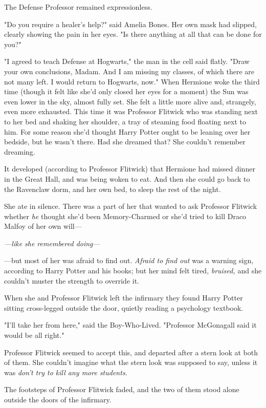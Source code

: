 The Defense Professor remained expressionless.

"Do you require a healer's help?" said Amelia Bones. Her own mask had slipped,
clearly showing the pain in her eyes. "Is there anything at all that can be
done for you?"

"I agreed to teach Defense at Hogwarts," the man in the cell said flatly. "Draw
your own conclusions, Madam. And I am missing my classes, of which there are
not many left. I would return to Hogwarts, now."
\sbreak
When Hermione woke the third time (though it felt like she'd only closed her
eyes for a moment) the Sun was even lower in the sky, almost fully set. She
felt a little more alive and, strangely, even more exhausted. This time it was
Professor Flitwick who was standing next to her bed and shaking her shoulder, a
tray of steaming food floating next to him. For some reason she'd thought Harry
Potter ought to be leaning over her bedside, but he wasn't there. Had she
dreamed that? She couldn't remember dreaming.

It developed (according to Professor Flitwick) that Hermione had missed dinner
in the Great Hall, and was being woken to eat. And then she could go back to
the Ravenclaw dorm, and her own bed, to sleep the rest of the night.

She ate in silence. There was a part of her that wanted to ask Professor
Flitwick whether \emph{he} thought she'd been Memory-Charmed or she'd tried to
kill Draco Malfoy of her own will---

\emph{---like she remembered doing---}

---but most of her was afraid to find out. \emph{Afraid to find out} was a
warning sign, according to Harry Potter and his books; but her mind felt tired,
\emph{bruised,} and she couldn't muster the strength to override it.

When she and Professor Flitwick left the infirmary they found Harry Potter
sitting cross-legged outside the door, quietly reading a psychology textbook.

"I'll take her from here," said the Boy-Who-Lived. "Professor McGonagall said
it would be all right."

Professor Flitwick seemed to accept this, and departed after a stern look at
both of them. She couldn't imagine what the stern look was supposed to say,
unless it was \emph{don't try to kill any more students.}

The footsteps of Professor Flitwick faded, and the two of them stood alone
outside the doors of the infirmary.

